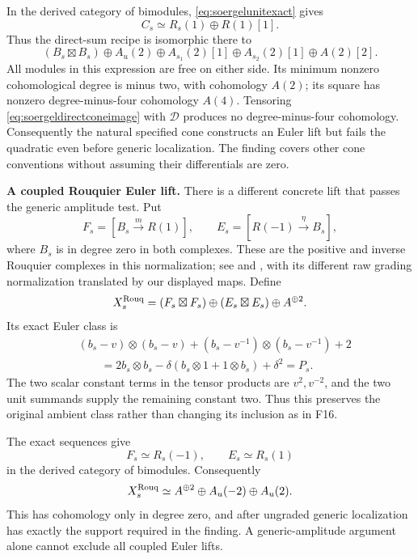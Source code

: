 \documentclass[11pt,a4paper]{article}
\newcommand{\mathscr}{\mathcal}
\renewcommand{\S}{\ensuremath{\mathsection}}
\newcommand{\fid}[1]{\textsf{#1}}\newcommand{\gate}[1]{\textsf{#1}}
\theoremstyle{named}\newtheorem{finding}{Finding}[section]
\theoremstyle{definition}\newtheorem{definition}[finding]{Definition}
\theoremstyle{remark}\newtheorem{remark}[finding]{Remark}
\begin{document}
In the derived category of bimodules,
\eqref{eq:soergelunitexact} gives
\[
                     C_s\simeq R_s(1)\oplus R(1)[1].
\]
Thus the direct-sum recipe is isomorphic there to
\begin{equation}\label{eq:soergeldirectconeimage}
 (B_s\boxtimes B_s)\oplus A_u(2)
 \oplus A_{s_1}(2)[1]\oplus A_{s_2}(2)[1]
 \oplus A(2)[2].
\end{equation}
All modules in this expression are free on either side.
Its minimum nonzero cohomological degree is minus two,
with cohomology \(A(2)\); its square has nonzero
degree-minus-four cohomology \(A(4)\).
Tensoring \eqref{eq:soergeldirectconeimage} with
\(\mathscr D\) produces no degree-minus-four cohomology.
Consequently the natural specified cone constructs an
Euler lift but fails the quadratic even before generic
localization. The finding covers other cone conventions
without assuming their differentials are zero.

\par\smallskip\noindent\textbf{A coupled Rouquier Euler lift.}\quad
There is a different concrete lift that passes the generic
amplitude test. Put
\[
 F_s=[B_s\xrightarrow{m}R(1)],\qquad
 E_s=[R(-1)\xrightarrow{\eta}B_s],
\]
where \(B_s\) is in degree zero in both complexes. These
are the positive and inverse Rouquier complexes in this
normalization; see \cite[\S6.4, p.~1121]{EW} and
\cite[\S3.2.4 and Lemma~3.3, p.~9; \S3.3.1,
p.~10]{RouquierBraid}, with its different raw grading
normalization translated by our displayed maps.
Define
\begin{equation}\label{eq:soergelcoupledRouquier}
 X_s^{\rm Rouq}=(F_s\boxtimes F_s)
       \oplus(E_s\boxtimes E_s)\oplus A^{\oplus2}.
\end{equation}
Its exact Euler class is
\begin{align*}
 &(b_s-v)\otimes(b_s-v)
 +(b_s-v^{-1})\otimes(b_s-v^{-1})+2\\
 &\qquad=2b_s\otimes b_s
    -\delta(b_s\otimes1+1\otimes b_s)+\delta^2=P_s.
\end{align*}
The two scalar constant terms in the tensor products are
\(v^2,v^{-2}\), and the two unit summands supply the
remaining constant two. Thus this preserves the original
ambient class rather than changing its inclusion as in
\fid{F16}.

The exact sequences give
\[
          F_s\simeq R_s(-1),\qquad E_s\simeq R_s(1)
\]
in the derived category of bimodules. Consequently
\begin{equation}\label{eq:soergelRouquierderivedimage}
 X_s^{\rm Rouq}\simeq A^{\oplus2}
                       \oplus A_u(-2)\oplus A_u(2).
\end{equation}
This has cohomology only in degree zero, and after
ungraded generic localization has exactly the support
required in the finding. A generic-amplitude argument
alone cannot exclude all coupled Euler lifts.
\end{document}
